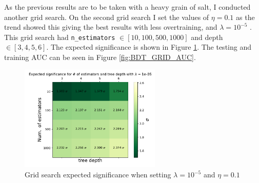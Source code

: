 \documentclass[12pt, a4paper]{book}
\begin{document}
\newpage\noindent As the previous results are to be taken with a heavy grain of salt, I conducted another grid search. On the second grid search I set the values of $\eta=0.1$ as the trend showed this giving the best results with less overtraining, 
and $\lambda=10^{-5}$ . This grid search had \verb|n_estimators| $\in[10, 100, 500, 1000]$ and depth $\in[3,4,5,6]$. 
The expected significance is shown in Figure \ref{fig:BDT_sig}. The testing and training AUC can be seen in Figure \ref{fig:BDT_GRID_AUC}.
\graphicspath{{../../../Plots/XGBoost/FULL/GRIDSEARCH_n_est_10-1000}}
\begin{figure}[!ht]
   \centering
   \includegraphics[width=0.6\textwidth]{Expected_significance.pdf}  
   \caption{Grid search expected significance when setting $\lambda=10^{-5}$ and $\eta=0.1$}\label{fig:BDT_sig}
\end{figure}
\end{document}
